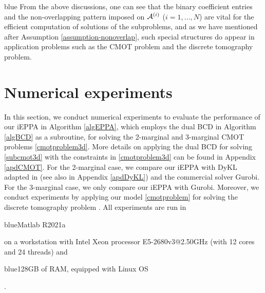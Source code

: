 \documentclass[10pt]{article}
\newcommand{\blue}[1]{\begin{color}{blue}#1\end{color}}
\newcommand{\cA}{{\cal A}}
\begin{document}
\blue{
From the above discussions, one can see that the binary coefficient entries and the non-overlapping pattern imposed on $\cA^{(i)}$ ($i=1,\dots,N$) are vital for the efficient computation of solutions of the subproblems, and as we have mentioned after Assumption \ref{assumption-nonoverlap}, such special structures do appear in application problems such as the CMOT problem and the discrete tomography problem.

}




\section{Numerical experiments}\label{secnum}

In this section, we conduct numerical experiments to evaluate the performance of our iEPPA in Algorithm \ref{algEPPA}, which employs the dual BCD in Algorithm \ref{algBCD} as a subroutine, for solving the 2-marginal and 3-marginal CMOT problems \eqref{cmotproblem3d}. More details on applying the dual BCD for solving \eqref{subcmot3d} with the constraints in \eqref{cmotproblem3d} can be found in Appendix \ref{apdCMOT}. For the 2-marginal case, we compare our iEPPA with DyKL adapted in \cite{bccnp2015iterative} (see also in Appendix \ref{apdDyKL}) and the commercial solver Gurobi. For the 3-marginal case, we only compare our iEPPA with Gurobi. Moreover, we conduct experiments by applying our model \eqref{cmotproblem} for solving the discrete tomography problem \cite{w2006tomography}. All experiments are run in \blue{{\sc Matlab} R2021a} on a workstation with Intel Xeon processor E5-2680v3@2.50GHz (with 12 cores and 24 threads) and \blue{128GB of RAM, equipped with Linux OS}.
\end{document}

